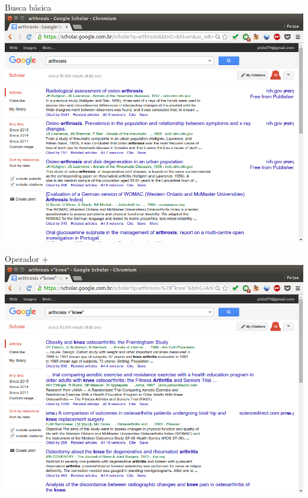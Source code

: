 \documentclass{beamer}
\begin{document}
\begin{frame}{Busca básica}
  \includegraphics[height=.85\textheight]{Busca/google-fu-basico}
\end{frame}

\begin{frame}{Operador +}
  \includegraphics[height=.85\textheight]{Busca/google-fu-plus}
\end{frame}
\end{document}
